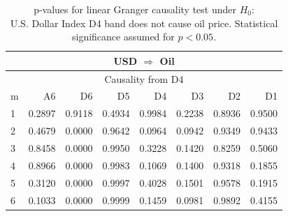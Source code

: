 %
%
\begin{table}[H]
\begin{center}
\begin{tabular}{l|r r r r r r r}
\hline\hline
\multicolumn{8}{c}{USD $\Rightarrow$ Oil}\\
\hline
\multicolumn{8}{c}{Causality from D4}\\
\hline\hline
m & A6 & D6 & D5 & D4 & D3 & D2 & D1 \\
\hline
1 & 0.2897 & 0.9118 & 0.4934 & 0.9984 & 0.2238 & 0.8936 & 0.9500 \\
2 & 0.4679 & \cellcolor{mygreen}0.0000 & 0.9642 & 0.0964 & 0.0942 & 0.9349 & 0.9433 \\
3 & 0.8458 & \cellcolor{mygreen}0.0000 & 0.9950 & 0.3228 & 0.1420 & 0.8259 & 0.5060 \\
4 & 0.8966 & \cellcolor{mygreen}0.0000 & 0.9983 & 0.1069 & 0.1400 & 0.9318 & 0.1855 \\
5 & 0.3120 & \cellcolor{mygreen}0.0000 & 0.9997 & 0.4028 & 0.1501 & 0.9578 & 0.1915 \\
6 & 0.1033 & \cellcolor{mygreen}0.0000 & 0.9999 & 0.1459 & 0.0981 & 0.9892 & 0.4155 \\
\hline\hline
\end{tabular}
\caption{p-values for linear Granger causality test under $H_0$:\\
U.S. Dollar Index D4 band does not cause oil price. Statistical significance assumed for $p<0.05$.}
\end{center}
\end{table}

